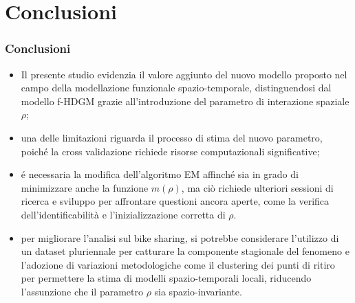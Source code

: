 \section{Conclusioni}
\begin{frame}
	\frametitle{Conclusioni}
	\centering
	
	\begin{itemize}
		\justifying
		\item Il presente studio evidenzia il valore aggiunto del nuovo modello proposto nel campo della modellazione funzionale spazio-temporale, distinguendosi dal modello f-HDGM grazie all'introduzione del parametro di interazione spaziale $\rho$;
		\item una delle limitazioni riguarda il processo di stima del nuovo parametro, poiché la cross validazione richiede risorse computazionali significative;
	\end{itemize}	
\end{frame}

\begin{frame}
	\centering
	\begin{itemize}
		\justifying
		\item é necessaria la modifica dell'algoritmo EM affinché sia in grado di minimizzare anche la funzione $m(\rho)$, ma ciò richiede ulteriori sessioni di ricerca e sviluppo per affrontare questioni ancora aperte, come la verifica dell'identificabilità e l'inizializzazione corretta di $\rho$.		
		\item per migliorare l'analisi sul bike sharing, si potrebbe considerare l'utilizzo di un dataset pluriennale per catturare la componente stagionale del fenomeno e l'adozione di variazioni metodologiche come il clustering dei punti di ritiro per permettere la stima di modelli spazio-temporali locali, riducendo l'assunzione che il parametro $\rho$ sia spazio-invariante.
	\end{itemize}	
\end{frame}